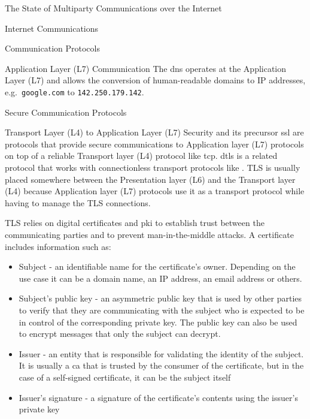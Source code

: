\begin{frame}[fragile]{The State of Multiparty Communications over the
Internet}
\begin{block}{Internet Communications}
\begin{block}{Communication Protocols}
\begin{block}{Application Layer (L7) Communication}
The \gls{dns} operates at the Application Layer (L7) and allows the
conversion of human-readable domains to IP addresses,
e.g.~\texttt{google.com} to \texttt{142.250.179.142}.
\end{block}
\end{block}

\begin{block}{Secure Communication Protocols}
\protect\hypertarget{secure-communication-protocols}{}
\begin{block}{Transport Layer (L4) to Application Layer (L7) Security}
\protect\hypertarget{transport-layer-l4-to-application-layer-l7-security}{}
 \autocite{tlsRFC} and its precursor \gls{ssl} are protocols
that provide secure communications to Application layer (L7) protocols
on top of a reliable Transport layer (L4) protocol like \gls{tcp}.
\gls{dtls} is a related protocol that works with connectionless
transport protocols like . TLS is usually placed somewhere
between the Presentation layer (L6) and the Transport layer (L4) because
Application layer (L7) protocols use it as a transport protocol while
having to manage the TLS connections.

TLS relies on digital certificates and \gls{pki} to establish trust
between the communicating parties and to prevent man-in-the-middle
attacks. A certificate includes information such as:

\begin{itemize}
\tightlist
\item
  Subject - an identifiable name for the certificate's owner. Depending
  on the use case it can be a domain name, an IP address, an email
  address or others.
\item
  Subject's public key - an asymmetric public key that is used by other
  parties to verify that they are communicating with the subject who is
  expected to be in control of the corresponding private key. The public
  key can also be used to encrypt messages that only the subject can
  decrypt.
\item
  Issuer - an entity that is responsible for validating the identity of
  the subject. It is usually a \gls{ca} that is trusted by the consumer
  of the certificate, but in the case of a self-signed certificate, it
  can be the subject itself
\item
  Issuer's signature - a signature of the certificate's contents using
  the issuer's private key
\end{itemize}


\end{block}
\end{block}
\end{block}
\end{frame}

